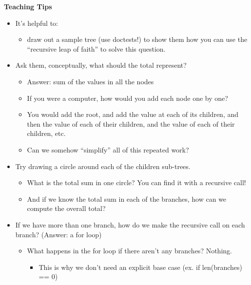 \begin{blocksection}
	\begin{guide}
	\textbf{Teaching Tips}
	\begin{itemize}
			\item It’s helpful to:
			\begin{itemize}
				\item draw out a sample tree (use doctests!) to show them how you can use the “recursive leap of faith” to solve this question.
			\end{itemize}
			\item Ask them, conceptually, what should the total represent?
			\begin{itemize}
				\item Answer: sum of the values in all the nodes
                \item If you were a computer, how would you add each node one by one?
                \item You would add the root, and add the value at each of its children, and then the value of each of their children, and the value of each of their children, etc.
                \item Can we somehow “simplify” all of this repeated work?
            \end{itemize}
            \item Try drawing a circle around each of the children sub-trees.
            \begin{itemize}
                \item What is the total sum in one circle? You can find it with a recursive call!
                \item And if we know the total sum in each of the branches, how can we compute the overall total?
            \end{itemize}
            \item If we have more than one branch, how do we make the recursive call on each branch? (Answer: a for loop)
            \begin{itemize}
                \item What happens in the for loop if there aren’t any branches? Nothing.
                \begin{itemize}
                    \item This is why we don’t need an explicit base case (ex. if len(branches) == 0)
                \end{itemize}
            \end{itemize}
	\end{itemize}
	\end{guide}
\end{blocksection}
